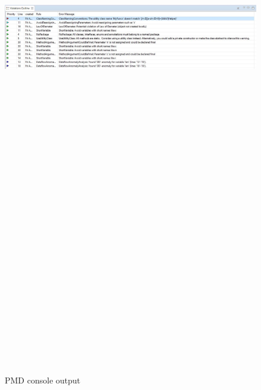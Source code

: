 \documentclass{article}
\begin{document}
\begin{figure}[h!]
  \centering
 \includegraphics[width=16cm,height=30cm,keepaspectratio]{pmd2.jpg}\\[1cm] 
  \caption{PMD console output}
\end{figure}
\end{document}
